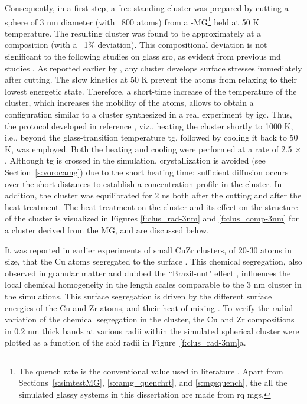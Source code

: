 \begin{changebar}
Consequently, in a first step, a free-standing cluster was prepared by cutting a sphere of 3 nm diameter (with ~800 atoms) from a  \cz-MG\footnote{The  quench rate is the conventional value used in literature \cite{Ritter2011,Adjaoud2016,Adjaoud2018}. Apart from Sections~\ref{s:simtestMG}, \ref{s:camg_quenchrt}, and \ref{s:mgsquench}, the all the simulated glassy systems in this dissertation are made from  \gls{rq} \gls{mg}s.} held at 50 K temperature. The resulting cluster was found to be approximately at a \cz composition (with a ~1\% deviation). This compositional deviation is not significant to the following studies on glass \gls{sro}, as evident from previous \gls{md} studies \cite{Peng2010}. As reported earlier by \textcite{Adjaoud2016}, any cluster develops surface stresses  immediately after cutting. The slow kinetics at 50 K prevent the atoms from relaxing to their lowest energetic state. Therefore, a short-time increase of the temperature of the cluster, which increases the mobility of the atoms, allows to obtain a configuration similar to a cluster synthesized in a real experiment by \gls{igc}. Thus, the protocol developed in reference \cite{Adjaoud2016}, viz., heating the cluster shortly to 1000 K, i.e., beyond the glass-transition temperature \gls{tg}, followed by cooling it back to 50 K, was employed. Both the heating and cooling were performed at a rate of 2.5 $\times$ . Although \gls{tg} is crossed in the simulation, crystallization is avoided (see Section~\ref{s:vorocamg}) due to the short heating time; sufficient diffusion occurs over the short distances to establish a concentration profile in the cluster. In addition, the cluster was equilibrated for 2 \gls{ns} both after the cutting and after the heat treatment. The heat treatment on the cluster and its effect on the structure of the cluster is visualized in Figures \ref{f:clus_rad-3nm} and \ref{f:clus_comp-3nm} for a cluster derived from the  MG, and are discussed below. \par
\end{changebar}

It was reported in earlier experiments of small CuZr clusters, of 20-30 atoms in size, that the Cu atoms segregated to the surface \cite{Kartouzian2014}. This chemical segregation, also observed in granular matter and dubbed the ``Brazil-nut" effect \cite{Rosato1987}, influences the local chemical homogeneity in the length scales comparable to the 3 nm cluster in the simulations. This surface segregation is driven by the different surface energies of the Cu and Zr atoms, and their heat of mixing \cite{Wang2016,Adjaoud2016}.  To verify the radial variation of the chemical segregation in the cluster, the Cu and Zr compositions in 0.2 nm thick bands at various radii within the simulated spherical cluster were plotted as a function of the said radii in Figure~\ref{f:clus_rad-3nm}a. \par 

